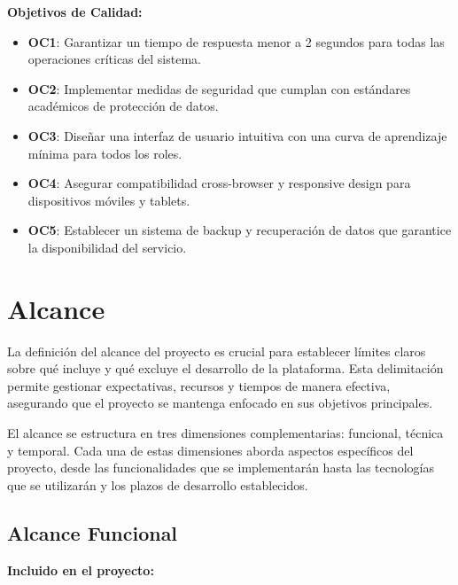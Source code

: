 \documentclass[12pt,a4paper,oneside]{report}
\providecommand{\tightlist}{%
  \setlength{\itemsep}{0pt}\setlength{\parskip}{0pt}}
\begin{document}
\textbf{Objetivos de Calidad:}

\begin{itemize}
\tightlist
\item
  \textbf{OC1}: Garantizar un tiempo de respuesta menor a 2 segundos
  para todas las operaciones críticas del sistema.
\item
  \textbf{OC2}: Implementar medidas de seguridad que cumplan con
  estándares académicos de protección de datos.
\item
  \textbf{OC3}: Diseñar una interfaz de usuario intuitiva con una curva
  de aprendizaje mínima para todos los roles.
\item
  \textbf{OC4}: Asegurar compatibilidad cross-browser y responsive
  design para dispositivos móviles y tablets.
\item
  \textbf{OC5}: Establecer un sistema de backup y recuperación de datos
  que garantice la disponibilidad del servicio.
\end{itemize}

\section{Alcance}\label{alcance}

La definición del alcance del proyecto es crucial para establecer
límites claros sobre qué incluye y qué excluye el desarrollo de la
plataforma. Esta delimitación permite gestionar expectativas, recursos y
tiempos de manera efectiva, asegurando que el proyecto se mantenga
enfocado en sus objetivos principales.

El alcance se estructura en tres dimensiones complementarias: funcional,
técnica y temporal. Cada una de estas dimensiones aborda aspectos
específicos del proyecto, desde las funcionalidades que se implementarán
hasta las tecnologías que se utilizarán y los plazos de desarrollo
establecidos.

\subsection{Alcance Funcional}\label{alcance-funcional}

\textbf{Incluido en el proyecto:}
\end{document}
